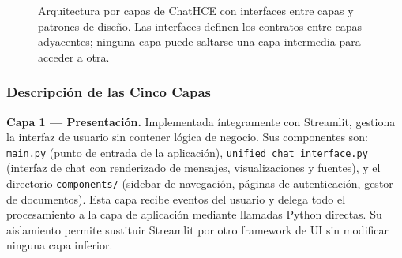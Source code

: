 \begin{figure}[t]
\caption{Arquitectura por capas de ChatHCE con interfaces entre capas y patrones de diseño. Las interfaces definen los contratos entre capas adyacentes; ninguna capa puede saltarse una capa intermedia para acceder a otra.}
\label{fig:capas_interfaces}
\end{figure}

\subsubsection{Descripción de las Cinco Capas}

\textbf{Capa 1 — Presentación.} Implementada íntegramente con Streamlit, gestiona la interfaz de usuario sin contener lógica de negocio. Sus componentes son: \texttt{main.py} (punto de entrada de la aplicación), \texttt{unified\_chat\_interface.py} (interfaz de chat con renderizado de mensajes, visualizaciones y fuentes), y el directorio \texttt{components/} (sidebar de navegación, páginas de autenticación, gestor de documentos). Esta capa recibe eventos del usuario y delega todo el procesamiento a la capa de aplicación mediante llamadas Python directas. Su aislamiento permite sustituir Streamlit por otro framework de UI sin modificar ninguna capa inferior.

